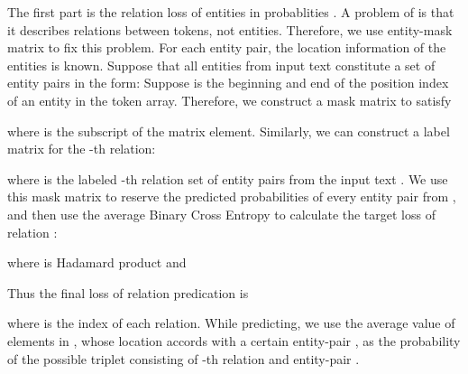 \documentclass[11pt,a4paper]{article}
\begin{document}
The first part  is the relation loss of entities in probablities . \fi
A problem of  is that it describes relations between tokens, not entities. Therefore, we use entity-mask matrix to fix this problem. For each entity pair, the location information of the entities is known. Suppose that all entities from input text  constitute a set of entity pairs in the form:
Suppose  is the beginning and end of the position index of an entity  in the token array. Therefore, we construct a mask matrix  to satisfy

where  is the subscript of the matrix element. Similarly, we can construct a label matrix  for the -th relation:

where  is the labeled -th relation set of entity pairs from the input text .
We use this mask matrix to reserve the predicted probabilities of every entity pair from , and then use the average Binary Cross Entropy to calculate the target loss  of relation :

where  is Hadamard product and

Thus the final loss  of relation predication is

where  is the index of each relation. While predicting, we use the average value of elements in , whose location accords with a certain entity-pair , as the probability of the possible triplet  consisting of -th relation and entity-pair .
\end{document}
